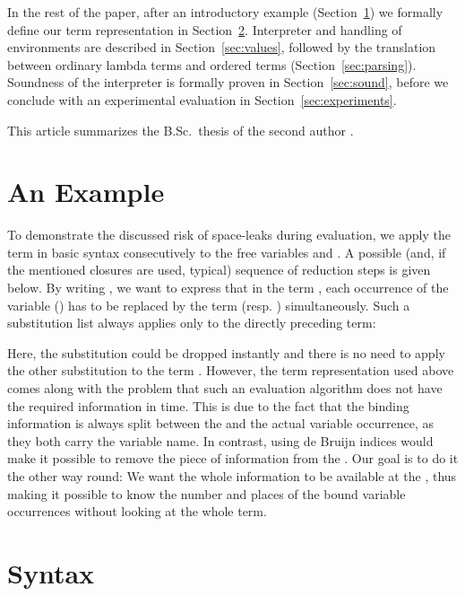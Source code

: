 \documentclass[submission,copyright,creativecommons]{eptcs}
\begin{document}
In the rest of the paper, after an introductory example
(Section~\ref{sec:example}) we formally define our term representation
in Section~\ref{sec:syntax}.   Interpreter and handling of
environments are described in Section~\ref{sec:values}, followed by
the translation between ordinary lambda terms and ordered terms
(Section~\ref{sec:parsing}).  Soundness of the interpreter is formally
proven in Section~\ref{sec:sound}, before we conclude with an
experimental evaluation in Section~\ref{sec:experiments}.

This article summarizes the B.Sc.\ thesis of the second author
\cite{kraus:bachelor}.

\section{An Example}
\label{sec:example}






To demonstrate the discussed risk of space-leaks during evaluation, we apply the term  in basic syntax consecutively to the free variables  and . A possible (and, if the mentioned closures are used, typical) sequence of reduction steps is given below.  
By writing , we want to express that in the term , each occurrence of the variable  () has to be replaced by the term  (resp. ) simultaneously. Such a substitution list always applies only to the directly preceding term:

Here, the substitution  could be dropped instantly and there is no need to apply the other substitution  to the term . 
However, the term representation used above comes along with the problem that such an evaluation algorithm does not have the required information in time.
This is due to the fact that the binding information is always split between the  and the actual variable occurrence, as they both carry the variable name.  
In contrast, using de Bruijn indices would make it possible to remove the piece of information from the .
Our goal is to do it the other way round: We want the whole information to be available at the , thus making it possible to know the number and places of the bound variable occurrences without looking at the whole term.







\section{Syntax}
\label{sec:syntax}
\end{document}

